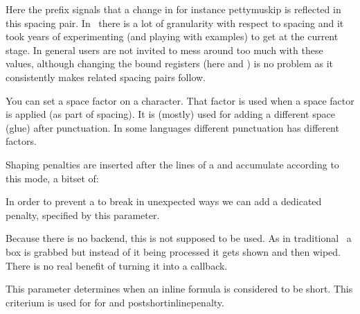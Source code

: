 Here the  prefix signals that a change in for instance \prm
{pettymuskip} is reflected in this spacing pair. In \CONTEXT\ there is a lot of
granularity with respect to spacing and it took years of experimenting (and
playing with examples) to get at the current stage. In general users are not
invited to mess around too much with these values, although changing the bound
registers (here  and ) is no problem as it
consistently makes related spacing pairs follow.

\stopnewprimitive

\startoldprimitive[title={\prm {sfcode}}]

You can set a space factor on a character. That factor is used when a space
factor is applied (as part of spacing). It is (mostly) used for adding a
different space (glue) after punctuation. In some languages different punctuation
has different factors.

\stopoldprimitive

\startnewprimitive[title={\prm {shapingpenaltiesmode}}]

Shaping penalties are inserted after the lines of a  and
accumulate according to this mode, a bitset of:


\stopnewprimitive

\startnewprimitive[title={\prm {shapingpenalty}}]

In order to prevent a  to break in unexpected ways we can add a
dedicated penalty, specified by this parameter.

\stopnewprimitive

\startoldprimitive[title={\prm {shipout}}][obsolete=yes]

Because there is no backend, this is not supposed to be used. As in traditional
\TEX\ a box is grabbed but instead of it being processed it gets shown and then
wiped. There is no real benefit of turning it into a callback.

\stopoldprimitive

\startnewprimitive[title={\prm {shortinlinemaththreshold}}]

This parameter determines when an inline formula is considered to be short. This
criterium is used for for  and \prm
{postshortinlinepenalty}.

\stopnewprimitive

\startnewprimitive[title={\prm {shortinlineorphanpenalty}}]

